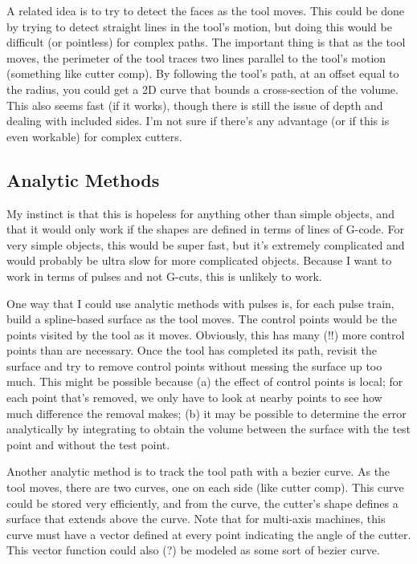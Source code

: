 \documentclass[titlepage,oneside,10pt]{article}
\begin{document}
A related idea is to try to detect the faces as the tool moves. This
could be done by trying to detect straight lines in the tool's motion,
but doing this would be difficult (or pointless) for complex
paths. The important thing is that as the tool moves, the perimeter of
the tool traces two lines parallel to the tool's motion (something
like cutter comp). By following the tool's path, at an offset equal to
the radius, you could get a 2D curve that bounds a cross-section of
the volume. This also seems fast (if it works), though there is still
the issue of depth and dealing with included sides. I'm not sure if
there's any advantage (or if this is even workable) for complex
cutters. 

\subsection{Analytic Methods}

My instinct is that this is hopeless for anything other than simple
objects, and that it would only work if the shapes are defined in
terms of lines of G-code. For very simple objects, this would be super
fast, but it's extremely complicated and would probably be ultra slow
for more complicated objects. Because I want to work in terms of
pulses and not G-cuts, this is unlikely to work.

One way that I could use analytic methods with pulses is, for each
pulse train, build a spline-based surface as the tool moves. The
control points would be the points visited by the tool as it
moves. Obviously, this has many (!!) more control points than are
necessary. Once the tool has completed its path, revisit the surface
and try to remove control points without messing the surface up too
much. This might be possible because (a) the effect of control points
is local; for each point that's removed, we only have to look at
nearby points to see how much difference the removal makes; (b) it may
be possible to determine the error analytically by integrating to
obtain the volume between the surface with the test point and without
the test point.

Another analytic method is to track the tool path with a bezier
curve. As the tool moves, there are two curves, one on each side (like
cutter comp). This curve could be stored very efficiently, and from
the curve, the cutter's shape defines a surface that extends above the
curve. Note that for multi-axis machines, this curve must have a
vector defined at every point indicating the angle of the cutter. This
vector function could also (?) be modeled as some sort of bezier curve.
\end{document}
